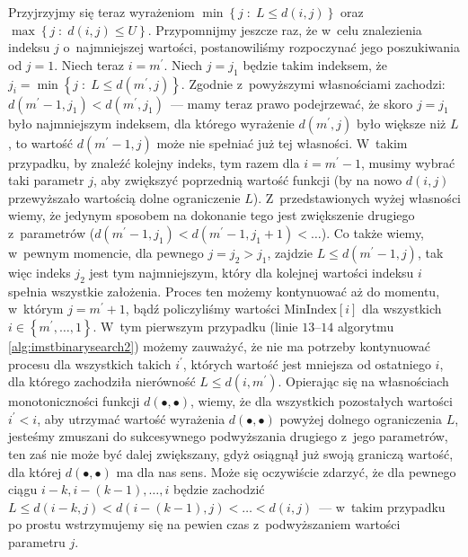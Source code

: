 Przyjrzyjmy się teraz wyrażeniom $\min \left\{ j \; : \; L \leqslant d \left( i, j \right) \right\}$ oraz $\max \left\{ j \; : \; d \left( i, j \right) \leqslant U \right\}$.
Przypomnijmy jeszcze raz, że w~celu znalezienia indeksu $j$ o~najmniejszej wartości, postanowiliśmy rozpoczynać jego poszukiwania od $j = 1$.
Niech teraz $i = m^{\prime}$.
Niech $j = j_{1}$ będzie takim indeksem, że $j_{i} = \min \left\{ j \; : \; L \leqslant d \left( m^{\prime}, j \right) \right\}$. 
Zgodnie z~powyższymi własnościami zachodzi: $d \left( m^{\prime} - 1, j_{1} \right) < d \left( m^{\prime}, j_{1} \right) $~--- mamy teraz prawo podejrzewać, że skoro $j = j_{1}$ było najmniejszym indeksem, dla którego wyrażenie $d \left( m^{\prime}, j \right)$ było większe niż $L$, to wartość $d \left( m^{\prime} - 1, j \right)$ może nie spełniać już tej własności.
W~takim przypadku, by znaleźć kolejny indeks, tym razem dla $i = m^{\prime} - 1$, musimy wybrać taki parametr $j$, aby zwiększyć poprzednią wartość funkcji (by na nowo $d \left( i, j \right)$ przewyższało wartością dolne ograniczenie $L$).
Z~przedstawionych wyżej własności wiemy, że jedynym sposobem na dokonanie tego jest zwiększenie drugiego z~parametrów ($d \left( m^{\prime} - 1, j_{1} \right) < d \left( m^{\prime} - 1, j_{1} + 1 \right) < \dots$).
Co także wiemy, w~pewnym momencie, dla pewnego $j = j_{2} > j_{1}$, zajdzie $L \leqslant d \left( m^{\prime} - 1, j \right)$, tak więc indeks $j_{2}$ jest tym najmniejszym, który dla kolejnej wartości indeksu $i$ spełnia wszystkie założenia.
Proces ten możemy kontynuować aż do momentu, w~którym $j = m^{\prime} + 1$, bądź policzyliśmy wartości $\text{MinIndex} \left[ i \right]$ dla wszystkich $i \in \left\{ m^{\prime}, \dots, 1 \right\}$.
W~tym pierwszym przypadku (linie $13$--$14$ algorytmu \ref{alg:imstbinarysearch2}) możemy zauważyć, że nie ma potrzeby kontynuować procesu dla wszystkich takich $i^{\prime}$, których wartość jest mniejsza od ostatniego $i$, dla którego zachodziła nierówność $L \leqslant d \left( i, m^{\prime} \right)$.
Opierając się na własnościach monotoniczności funkcji $d \left( \bullet, \bullet \right)$, wiemy, że dla wszystkich pozostałych wartości $i^{\prime} < i$, aby utrzymać wartość wyrażenia $d \left( \bullet, \bullet \right)$ powyżej dolnego ograniczenia $L$, jesteśmy zmuszani do sukcesywnego podwyższania drugiego z~jego parametrów, ten zaś nie może być dalej zwiększany, gdyż osiągnął już swoją graniczą wartość, dla której $d \left( \bullet, \bullet \right)$ ma dla nas sens.
Może się oczywiście zdarzyć, że dla pewnego ciągu $i - k, i - \left( k - 1 \right), \dots, i$ będzie zachodzić $L \leqslant d \left( i - k, j \right) < d \left( i - \left( k - 1 \right), j \right) < \dots < d \left( i , j \right)$~--- w~takim przypadku po prostu wstrzymujemy się na pewien czas z~podwyższaniem wartości parametru $j$.

